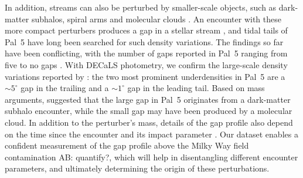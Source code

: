 \documentclass[twocolumn]{aastex62}
\newcommand{\ab}[1]{{\color{teal} AB: #1}}
\begin{document}
In addition, streams can also be perturbed by smaller-scale objects, such as dark-matter subhalos, spiral arms and molecular clouds \citep[e.g.,][]{Yoon:2011,Amorisco:2016, Banik:2019}.
An encounter with these more compact perturbers produces a gap in a stellar stream \citep[e.g.,][]{Johnston:2002,Ibata:2002}, and tidal tails of Pal~5 have long been searched for such density variations.
The findings so far have been conflicting, with the number of gaps reported in Pal~5 ranging from five \citep{Carlberg:2012} to no gaps \citep{Ibata:2016}.
With DECaLS photometry, we confirm the large-scale density variations reported by \citet{Erkal:2017}: the two most prominent underdensities in Pal~5 are a $\sim5^\circ$ gap in the trailing and a $\sim1^\circ$ gap in the leading tail.
Based on mass arguments, \citet{Erkal:2017} suggested that the large gap in Pal~5 originates from a dark-matter subhalo encounter, while the small gap may have been produced by a molecular cloud.
In addition to the perturber's mass, details of the gap profile also depend on the time since the encounter and its impact parameter \citep{Erkal:2015}.
Our dataset enables a confident measurement of the gap profile above the Milky Way field contamination \ab{quantify?}, which will help in disentangling different encounter parameters, and ultimately determining the origin of these perturbations.
\end{document}
